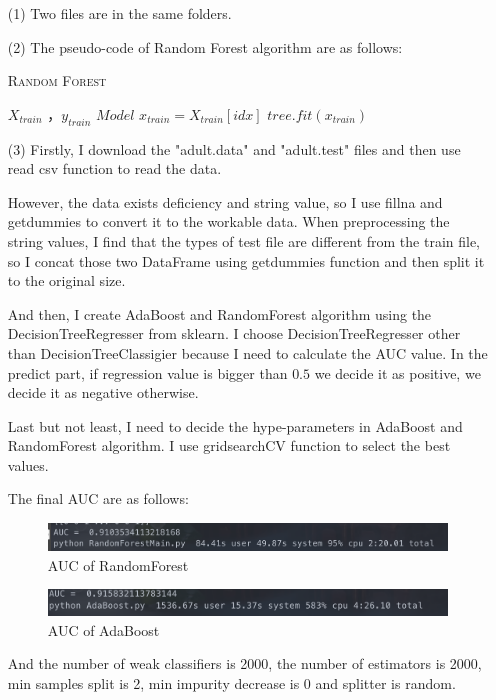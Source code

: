\begin{solution}
    \begin{enumerate}
        \item[(1)] Two files are in the same folders.
        \item[(2)] The pseudo-code of Random Forest algorithm are as follows:
            \begin{algorithm}
                \caption {\textsc{Random Forest}}
                \begin {algorithmic}[1] %
                \Require $X_{train}$ ，$y_{train}$
                \Ensure $Model$
                \State
                \State$x_{train} = X_{train}[idx]$
                \State$tree.fit(x_{train})$
                \State
                \EndFunction
            \end{algorithmic}
    \end{algorithm}
\item[(3)]
    Firstly, I download the "adult.data" and "adult.test" files and then use read csv function to read the data.

    However, the data exists deficiency and string value, so I use fillna and getdummies to convert it to the workable data. When preprocessing the string values, I find that the types of test file are different from the train file, so I concat those two DataFrame using getdummies function and then split it to the original size.

    And then, I create AdaBoost and RandomForest algorithm using the DecisionTreeRegresser from sklearn. I choose DecisionTreeRegresser other than DecisionTreeClassigier because I need to calculate the AUC value. In the predict part, if regression value is bigger than $0.5$ we decide it as positive, we decide it as negative otherwise.

    Last but not least, I need to decide the hype-parameters in AdaBoost and RandomForest algorithm. I use gridsearchCV function to select the best values.

    The final AUC are as follows:
    \begin{figure}[H]
        \centering
        \includegraphics[width=0.7\linewidth]{1.png}
        \caption{AUC of RandomForest}
        \label{fig:Random}
    \end{figure}
    \begin{figure}[H]
        \centering
        \includegraphics[width=0.7\linewidth]{2.png}
        \caption{AUC of AdaBoost}
        \label{fig:Random}
    \end{figure}
    And the number of weak classifiers is 2000, the number of estimators is 2000, min samples split is 2, min impurity decrease is 0 and splitter is random.
\end{enumerate}
\end{solution}

